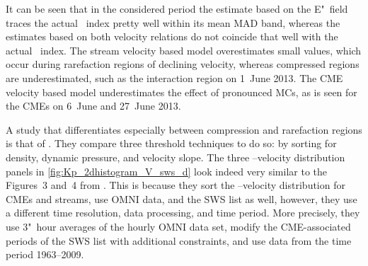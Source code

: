 It can be seen that in the considered period the \Kp{} estimate based on the E"~field traces the actual \Kp~index pretty well within its mean MAD band, whereas the \Kp{} estimates based on both velocity relations do not coincide that well with the actual \Kp~index. The stream velocity based model overestimates small \Kp{} values, which occur during rarefaction regions of declining velocity, whereas compressed regions are underestimated, such as the interaction region on 1~June 2013. The CME velocity based model underestimates the effect of pronounced MCs, as is seen for the CMEs on 6~June and 27~June 2013.

A study that differentiates especially between compression and rarefaction regions is that of \citet{Elliott2013}. They compare three threshold techniques to do so: by sorting for density, dynamic pressure, and velocity slope. The three \Kp--velocity distribution panels in \autoref{fig:Kp_2dhistogram_V_sws_d} look indeed very similar to the Figures~3 and~4 from \citet{Elliott2013}. This is because they sort the \Kp{}--velocity distribution for CMEs and streams, use OMNI data, and the SWS list as well, however, they use a different time resolution, data processing, and time period. More precisely, they use 3"~hour averages of the hourly OMNI data set, modify the CME-associated periods of the SWS list with additional constraints, and use data from the time period 1963--2009.

\pagebreak

